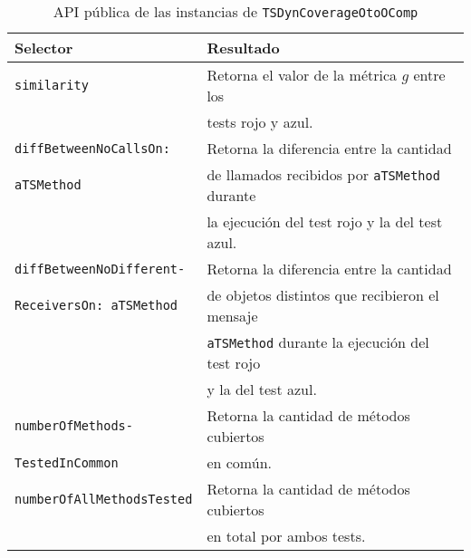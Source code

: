 \begin{table}[h] 
    \centering 
    \begin{tabular}{|l|l|}
    	\hline
\textbf{Selector} & \textbf{Resultado} \\ \hline \hline

{\tt similarity } & Retorna el valor de la métrica $g$ entre los \\
				 & tests rojo y azul. \\ \hline	
{\tt diffBetweenNoCallsOn:} & Retorna la diferencia entre la cantidad \\ 
{\tt  aTSMethod}		& de llamados recibidos por {\tt aTSMethod} durante  \\ 
						& la ejecución del test rojo y la del test azul.\\ \hline
{\tt diffBetweenNoDifferent-}	& Retorna la diferencia entre la cantidad \\ 
{\tt ReceiversOn: aTSMethod } &  de objetos distintos que recibieron el mensaje  \\
						& {\tt aTSMethod} durante la ejecución del test rojo \\
						& y la del test azul.\\ \hline
{\tt numberOfMethods- } & Retorna la cantidad de métodos cubiertos\\
{\tt TestedInCommon}						&  en común.\\ \hline
{\tt numberOfAllMethodsTested} & Retorna la cantidad de métodos cubiertos \\
						& en total por ambos tests. \\ \hline		
				
    \end{tabular}
    \caption{API pública de las instancias de {\tt TSDynCoverageOtoOComp}}
\end{table} 




